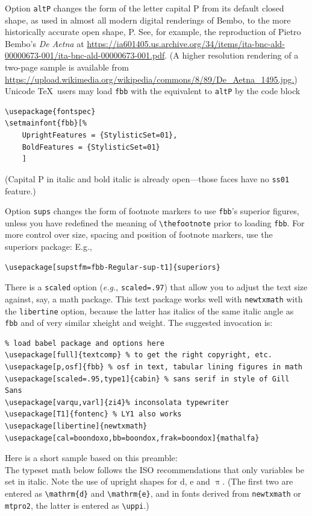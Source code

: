 \documentclass{article}
\begin{document}
Option {\tt altP} changes the form of the letter capital P from its default closed shape, as used in almost all modern digital renderings of Bembo, to the more historically accurate open shape, {\altp P}. See, for example, the reproduction of Pietro Bembo's \textit{De Aetna} at \url{https://ia601405.us.archive.org/34/items/ita-bnc-ald-00000673-001/ita-bnc-ald-00000673-001.pdf}. (A higher resolution rendering of  a two-page sample is available from \url{https://upload.wikimedia.org/wikipedia/commons/8/89/De_Aetna_1495.jpg.}) Unicode \TeX\ users may load {\tt fbb} with the equivalent to {\tt altP} by the code block
\begin{verbatim}
\usepackage{fontspec}
\setmainfont{fbb}[%
	UprightFeatures = {StylisticSet=01},
	BoldFeatures = {StylisticSet=01}
	]
\end{verbatim}
(Capital P in italic and bold italic is already open---those faces have no {\tt ss01} feature.)

Option {\tt sups} changes the form of footnote markers to use {\tt fbb}'s superior figures, unless you have redefined the meaning of \verb|\thefootnote| prior to loading {\tt fbb}. For more control over size, spacing and position of footnote markers, use the \textsf{superiors} package: E.g.,
\begin{verbatim}
\usepackage[supstfm=fbb-Regular-sup-t1]{superiors}
\end{verbatim}


There is a {\tt scaled} option (\emph{e.g.}, {\tt scaled=.97}) that allow you to adjust the text size against, say, a math package. This text package works well with {\tt newtxmath} with the {\tt libertine} option, because the latter has italics of the same italic angle as {\tt fbb} and of very similar xheight and weight. The suggested invocation is:
\begin{verbatim}
% load babel package and options here
\usepackage[full]{textcomp} % to get the right copyright, etc.
\usepackage[p,osf]{fbb} % osf in text, tabular lining figures in math
\usepackage[scaled=.95,type1]{cabin} % sans serif in style of Gill Sans
\usepackage[varqu,varl]{zi4}% inconsolata typewriter
\usepackage[T1]{fontenc} % LY1 also works
\usepackage[libertine]{newtxmath}
\usepackage[cal=boondoxo,bb=boondox,frak=boondox]{mathalfa}
\end{verbatim}
Here is a short sample based on this preamble:\\[4pt]
\def\Pr{\ensuremath{\mathbb{P}}}
\def\rmd{\mathrm{d}}
The typeset math below follows the ISO recommendations that only variables
be set in italic. Note the use of upright shapes for $\rmd$, $\mathrm{e}$
and $\uppi$. (The first two are entered as \verb|\mathrm{d}| and
\verb|\mathrm{e}|, and in fonts derived from {\tt newtxmath} or {\tt mtpro2},
 the latter is entered as \verb|\uppi|.)
\end{document}
